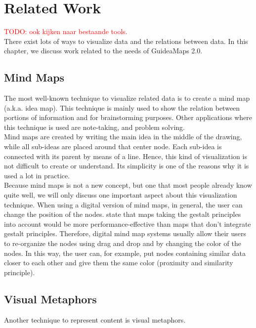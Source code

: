 \chapter{Related Work}\label{ch:related-work}

\textcolor{red}{TODO: ook kijken naar bestaande tools.}\\

There exist lots of ways to visualize data and the relations between data. In this chapter, we discuss work related to the needs of GuideaMaps 2.0.

\section{Mind Maps}
The most well-known technique to visualize related data is to create a mind map (a.k.a. idea map). This technique is mainly used to show the relation between portions of information and for brainstorming purposes. Other applications where this technique is used are note-taking, and problem solving. \citep{knowledgemapsbalaid} \\

Mind maps are created by writing the main idea in the middle of the drawing, while all sub-ideas are placed around that center node. Each sub-idea is connected with its parent by means of a line. Hence, this kind of visualization is not difficult to create or understand. Its simplicity is one of the reasons why it is used a lot in practice.\\

Because mind maps is not a new concept, but one that most people already know quite well, we will only discuss one important aspect about this visualization technique. When using a digital version of mind maps, in general, the user can change the position of the nodes. \cite{wiegmann-1992} state that maps taking the gestalt principles into account would be more performance-effective than maps that don't integrate gestalt principles. Therefore, digital mind map systems usually allow their users to re-organize the nodes using drag and drop and by changing the color of the nodes. In this way, the user can, for example, put nodes containing similar data closer to each other and give them the same color (proximity and similarity principle).



\section{Visual Metaphors}
Another technique to represent content is visual metaphors.

